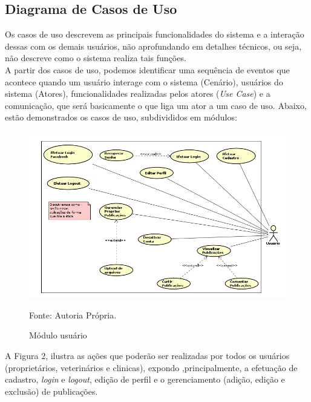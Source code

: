 \subsection{Diagrama de Casos de Uso}
Os casos de uso descrevem as principais funcionalidades do sistema e a interação dessas com os demais usuários, não aprofundando em detalhes técnicos, ou seja, não descreve como o sistema realiza tais funções.
\\
\indent
A partir dos casos de uso, podemos identificar uma sequência de eventos que acontece quando um usuário interage com o sistema (Cenário), usuários do sistema (Atores), funcionalidades realizadas pelos atores ({\it Use Case}) e a comunicação, que será basicamente o que liga um ator a um caso de uso. Abaixo, estão demonstrados os casos de uso, subdivididos em módulos:


\begin{figure}[h!]
	\centering	\includegraphics[scale=0.50
	]{imagens/usercasodeuso}
	\caption{Módulo usuário}
	Fonte: Autoria Própria.
	\label{Rotulo}
\end{figure}

\newpage
A Figura 2, ilustra as ações que poderão ser realizadas por todos os usuários (proprietários, veterinários e clinicas), expondo ,principalmente, a efetuação de cadastro, {\it login} e {\it logout}, edição de perfil e o gerenciamento (adição, edição e exclusão) de publicações.


